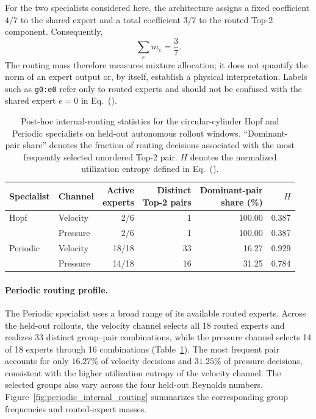 For the two specialists considered here, the architecture assigns a fixed coefficient $4/7$ to the shared expert and a total coefficient $3/7$ to the routed Top-2 component. Consequently,
\begin{equation}
  \sum_e m_e=\frac{3}{7}.
\end{equation}
The routing mass therefore measures mixture allocation; it does not quantify the norm of an expert output or, by itself, establish a physical interpretation.
Labels such as \texttt{g0:e0} refer only to routed experts and should not be confused with the shared expert $e=0$ in
Eq.~().

\par
\begin{table}[H]
\centering
\caption{
Post-hoc internal-routing statistics for the circular-cylinder Hopf and Periodic specialists on held-out autonomous rollout windows. ``Dominant-pair share'' denotes the fraction of routing decisions associated with the most frequently selected unordered Top-2 pair. $H$ denotes the normalized utilization entropy defined in Eq.~().
}
\label{tab:internal_routing_summary}
\small
\setlength{\tabcolsep}{5pt}
\begin{tabular}{@{}llrrrr@{}}
\toprule
Specialist & Channel & \shortstack{Active\\experts} & \shortstack{Distinct\\Top-2 pairs} & \shortstack{Dominant-pair\\share (\%)} & $H$ \\
\midrule
Hopf & Velocity & 2/6 & 1 & 100.00 & 0.387 \\
     & Pressure & 2/6 & 1 & 100.00 & 0.387 \\
\addlinespace
Periodic & Velocity & 18/18 & 33 & 16.27 & 0.929 \\
         & Pressure & 14/18 & 16 & 31.25 & 0.784 \\
\bottomrule
\end{tabular}
\end{table}
\par

\paragraph{Periodic routing profile.}
The Periodic specialist uses a broad range of its available routed experts. Across the held-out rollouts, the velocity channel selects all 18 routed experts and realizes 33 distinct group--pair combinations, while the pressure channel selects 14 of 18 experts through 16 combinations (Table~\ref{tab:internal_routing_summary}). The most frequent pair accounts for only $16.27\%$ of velocity decisions and $31.25\%$ of pressure decisions, consistent with the higher utilization entropy of the velocity channel. The selected groups also vary across the four held-out Reynolds numbers.
Figure~\ref{fig:periodic_internal_routing} summarizes the corresponding group frequencies and routed-expert masses.



